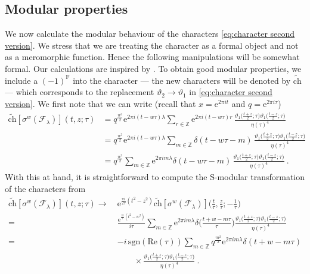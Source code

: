 \documentclass[12pt,a4paper]{article}
\begin{document}
\subsection{Modular properties} \label{subapp:modular properties}
We now calculate the modular behaviour of the characters \eqref{eq:character second version}. We stress that we are treating the character as a formal object and not as a meromorphic function. Hence the following manipulations will be somewhat formal. Our calculations are inspired by \cite{Maldacena:2000hw,Creutzig:2012sd}. To obtain good modular properties, we include a $(-1)^{\mathrm{F}}$ into the character --- the new characters will be denoted by $\tilde{\mathrm{ch}}$ ---  which corresponds to the replacement $\vartheta_2 \longrightarrow \vartheta_1$ in \eqref{eq:character second version}. We first note that we can write (recall that $x=\mathrm{e}^{2\pi i t}$ and $q=\mathrm{e}^{2\pi i \tau}$)
\begin{align} 
\tilde{\mathrm{ch}}[\sigma^w(\mathscr{F}_\lambda)](t,z;\tau)&=q^{\frac{w^2}{2}} \mathrm{e}^{2\pi i(t-w \tau)\lambda}\sum_{r \in \mathds{Z}} \mathrm{e}^{2\pi i(t-w\tau)r} \, \frac{\vartheta_1\big(\frac{t+z}{2};\tau\big)\vartheta_1\big(\frac{t-z}{2};\tau\big)}{\eta(\tau)^4}\\
&=q^{\frac{w^2}{2}} \mathrm{e}^{2\pi i(t-w \tau)\lambda} \sum_{m \in \mathds{Z}}\delta(t-w \tau-m) \, \frac{\vartheta_1\big(\frac{t+z}{2};\tau\big)\vartheta_1\big(\frac{t-z}{2};\tau\big)}{\eta(\tau)^4} \\
&=q^{\frac{w^2}{2}} \sum_{m \in \mathds{Z}} \mathrm{e}^{2\pi i m \lambda} \delta(t-w \tau-m)\, \frac{\vartheta_1\big(\frac{t+z}{2};\tau\big)\vartheta_1\big(\frac{t-z}{2};\tau\big)}{\eta(\tau)^4}\ .
\end{align}
With this at hand, it is straightforward to compute the S-modular transformation of the characters from
\begin{align}
\tilde{\mathrm{ch}}[\sigma^w(\mathscr{F}_\lambda)](t,z;\tau)\rightarrow\ &\mathrm{e}^{\frac{\pi i}{2\tau}(t^2-z^2)}\tilde{\mathrm{ch}}[\sigma^w(\mathscr{F}_\lambda)]\big(\tfrac{t}{\tau},\tfrac{z}{\tau};-\tfrac{1}{\tau}\big) \\
=&\frac{\mathrm{e}^{\frac{\pi i}{\tau}(t^2-w^2)}}{i \tau}\sum_{m \in \mathds{Z}} \mathrm{e}^{2\pi i m \lambda} \delta \big(\tfrac{t+w-m \tau}{\tau}\big) \frac{\vartheta_1\big(\frac{t+z}{2};\tau\big)\vartheta_1\big(\frac{t-z}{2};\tau\big)}{\eta(\tau)^4} \\
=&-i\, \mathrm{sgn}(\mathrm{Re}(\tau)) \sum_{m \in \mathds{Z}} q^{\frac{m^2}{2}} \mathrm{e}^{2\pi i m \lambda} \delta(t+w-m \tau)\nonumber\\
&\qquad\times\frac{\vartheta_1\big(\frac{t+z}{2};\tau\big)\vartheta_1\big(\frac{t-z}{2};\tau\big)}{\eta(\tau)^4}\ . \label{eq:S modular transform character}
\end{align}
\end{document}
